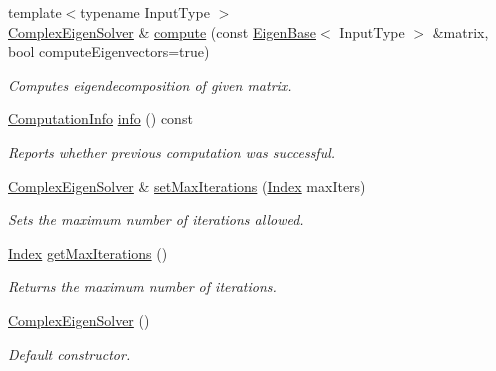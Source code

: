 \begin{DoxyCompactItemize}
{\footnotesize template$<$typename Input\+Type $>$ }\\\hyperlink{group___eigenvalues___module_class_eigen_1_1_complex_eigen_solver}{Complex\+Eigen\+Solver} \& \hyperlink{group___eigenvalues___module_aeb7e38c6db5369f5c974f3786e94c1f0}{compute} (const \hyperlink{group___core___module_struct_eigen_1_1_eigen_base}{Eigen\+Base}$<$ Input\+Type $>$ \&matrix, bool compute\+Eigenvectors=true)
\begin{DoxyCompactList}\small\item\em Computes eigendecomposition of given matrix. \end{DoxyCompactList}\item 
\hyperlink{group__enums_ga85fad7b87587764e5cf6b513a9e0ee5e}{Computation\+Info} \hyperlink{group___eigenvalues___module_ad4d9d8b90145900b9686d2dabbe46730}{info} () const
\begin{DoxyCompactList}\small\item\em Reports whether previous computation was successful. \end{DoxyCompactList}\item 
\mbox{\label{group___eigenvalues___module_a0c5a974da17774d75be41e351e6bda62}} 
\hyperlink{group___eigenvalues___module_class_eigen_1_1_complex_eigen_solver}{Complex\+Eigen\+Solver} \& \hyperlink{group___eigenvalues___module_a0c5a974da17774d75be41e351e6bda62}{set\+Max\+Iterations} (\hyperlink{group___eigenvalues___module_abc0218d8b902af0d6c759bfc0a8a8d74}{Index} max\+Iters)
\begin{DoxyCompactList}\small\item\em Sets the maximum number of iterations allowed. \end{DoxyCompactList}\item 
\mbox{\label{group___eigenvalues___module_aeec4754e32bf2d1c650bf3aed110c3d3}} 
\hyperlink{group___eigenvalues___module_abc0218d8b902af0d6c759bfc0a8a8d74}{Index} \hyperlink{group___eigenvalues___module_aeec4754e32bf2d1c650bf3aed110c3d3}{get\+Max\+Iterations} ()
\begin{DoxyCompactList}\small\item\em Returns the maximum number of iterations. \end{DoxyCompactList}\item 
\hyperlink{group___eigenvalues___module_a3322a21574c61eefd450c003515ad802}{Complex\+Eigen\+Solver} ()
\begin{DoxyCompactList}\small\item\em Default constructor. \end{DoxyCompactList}\item 

\end{DoxyCompactItemize}
